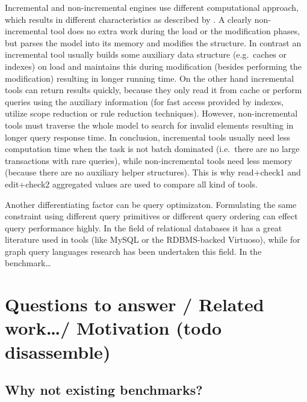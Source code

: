 Incremental and non-incremental engines use different computational approach,
which results in different characteristics as described by
. A clearly non-incremental tool does no extra work
during the load or the modification phases, but parses the model into its memory and
modifies the structure. In contrast an incremental tool usually builds some
auxiliary data structure (e.g.\ caches or indexes) on load and maintains this
during modification (besides performing the modification) resulting in longer running time. On the other hand incremental tools can return results quickly,
because they only read it from cache or perform queries using the auxiliary
information (for fast access provided by indexes, utilize scope reduction or
rule reduction techniques). However, non-incremental tools must traverse the
whole model to search for invalid elements resulting in longer query response
time. In conclusion, incremental tools usually need less computation time when
the task is not batch dominated (i.e.\ there are no large transactions with rare
queries), while non-incremental tools need less memory (because there are no
auxiliary helper structures). This is why read+check1 and edit+check2 aggregated
values are used to compare all kind of tools.

Another differentiating factor can be query optimizaton. Formulating the same
constraint using different query primitives or different query ordering can
effect query performance highly. In the field of relational databases it has a
great literature used in tools (like MySQL or the RDBMS-backed Virtuoso), while
for graph query languages research has been undertaken this field. 
 In the benchmark\ldots {}

\section{Questions to answer / Related work\ldots / Motivation (todo disassemble)}

\subsection{Why not existing benchmarks?}

